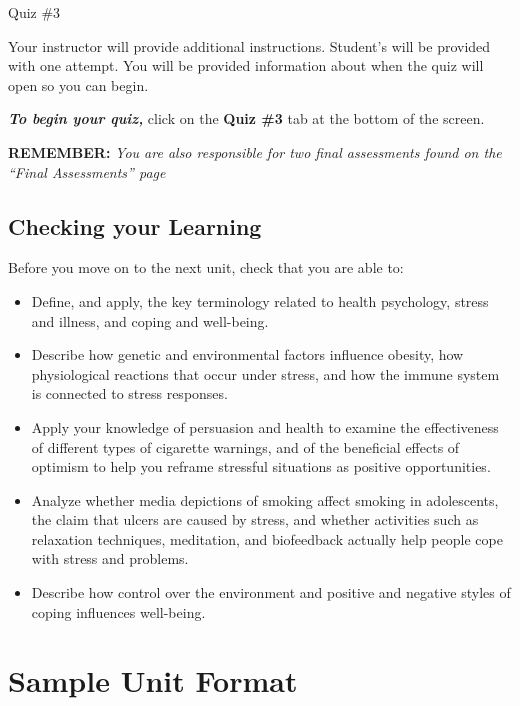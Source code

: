 \documentclass[
]{book}
\begin{document}
\begin{assessment}
{Quiz \#3}

Your instructor will provide additional instructions. Student's will be provided with one attempt. You will be provided information about when the quiz will open so you can begin.

\textbf{\emph{To begin your quiz,}} click on the \textbf{Quiz \#3} tab at the bottom of the screen.

\textbf{REMEMBER:} \emph{You are also responsible for two final assessments found on the ``Final Assessments'' page}
\end{assessment}

\hypertarget{checking-your-learning-11}{%
\section*{Checking your Learning}\label{checking-your-learning-11}}

\begin{progress}
Before you move on to the next unit, check that you are able to:

\begin{itemize}
\item
  Define, and apply, the key terminology related to health psychology, stress and illness, and coping and well-being.
\item
  Describe how genetic and environmental factors influence obesity, how physiological reactions that occur under stress, and how the immune system is connected to stress responses.
\item
  Apply your knowledge of persuasion and health to examine the effectiveness of different types of cigarette warnings, and of the beneficial effects of optimism to help you reframe stressful situations as positive opportunities.
\item
  Analyze whether media depictions of smoking affect smoking in adolescents, the claim that ulcers are caused by stress, and whether activities such as relaxation techniques, meditation, and biofeedback actually help people cope with stress and problems.
\item
  Describe how control over the environment and positive and negative styles of coping influences well-being.
\end{itemize}
\end{progress}

\hypertarget{sample-unit-format}{%
\chapter{Sample Unit Format}\label{sample-unit-format}}
\end{document}
